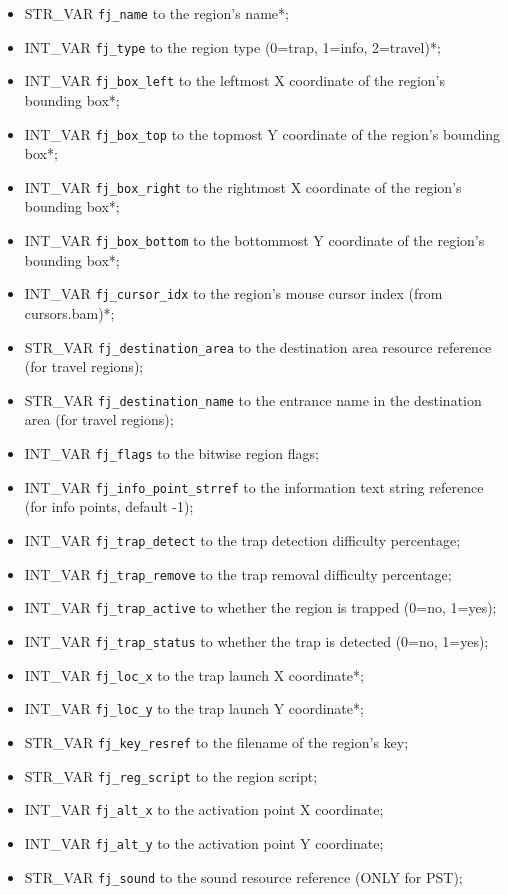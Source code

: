\documentclass{article}
\begin{document}
\begin{itemize}
\item STR_VAR \verb+fj_name+ to the region's name*;
\item INT_VAR \verb+fj_type+ to the region type (0=trap, 1=info, 2=travel)*;
\item INT_VAR \verb+fj_box_left+ to the leftmost X coordinate of the region's bounding box*;
\item INT_VAR \verb+fj_box_top+ to the topmost Y coordinate of the region's bounding box*;
\item INT_VAR \verb+fj_box_right+ to the rightmost X coordinate of the region's bounding box*;
\item INT_VAR \verb+fj_box_bottom+ to the bottommost Y coordinate of the region's bounding box*;
\item INT_VAR \verb+fj_cursor_idx+ to the region's mouse cursor index (from cursors.bam)*;
\item STR_VAR \verb+fj_destination_area+ to the destination area resource reference (for travel regions);
\item STR_VAR \verb+fj_destination_name+ to the entrance name in the destination area (for travel regions);
\item INT_VAR \verb+fj_flags+ to the bitwise region flags;
\item INT_VAR \verb+fj_info_point_strref+ to the information text string reference (for info points, default -1);
\item INT_VAR \verb+fj_trap_detect+ to the trap detection difficulty percentage;
\item INT_VAR \verb+fj_trap_remove+ to the trap removal difficulty percentage;
\item INT_VAR \verb+fj_trap_active+ to whether the region is trapped (0=no, 1=yes);
\item INT_VAR \verb+fj_trap_status+ to whether the trap is detected (0=no, 1=yes);
\item INT_VAR \verb+fj_loc_x+ to the trap launch X coordinate*;
\item INT_VAR \verb+fj_loc_y+ to the trap launch Y coordinate*;
\item STR_VAR \verb+fj_key_resref+ to the filename of the region's key;
\item STR_VAR \verb+fj_reg_script+ to the region script;
\item INT_VAR \verb+fj_alt_x+ to the activation point X coordinate;
\item INT_VAR \verb+fj_alt_y+ to the activation point Y coordinate;
\item STR_VAR \verb+fj_sound+ to the sound resource reference (ONLY for PST);

\end{itemize}
\end{document}
